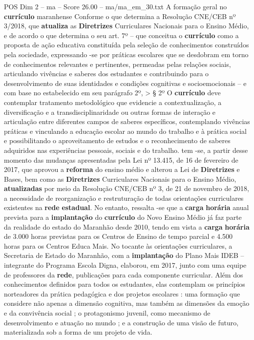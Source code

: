 \begin{textsample}{POS Dim 2 – ma – Score 26.00 – ma/ma\_em\_30.txt}
A formação geral no \textbf{currículo} maranhense Conforme o que determina a Resolução CNE/CEB nº 3/2018, que \textbf{atualiza} as \textbf{Diretrizes} Curriculares Nacionais para o Ensino Médio, e de acordo o que determina o seu art. 7º – que conceitua o \textbf{currículo} como a proposta de ação educativa constituída pela seleção de conhecimentos construídos pela sociedade, expressando -se por práticas escolares que se desdobram em torno de conhecimentos relevantes e pertinentes, permeadas pelas relações sociais, articulando vivências e saberes dos estudantes e contribuindo para o desenvolvimento de suas identidades e condições cognitivas e socioemocionais – e com base no estabelecido em seu parágrafo 2º, > § 2º O \textbf{currículo} deve contemplar tratamento metodológico que evidencie a contextualização, a diversificação e a transdisciplinaridade ou outras formas de interação e articulação entre diferentes campos de saberes específicos, contemplando vivências práticas e vinculando a educação escolar ao mundo do trabalho e à prática social e possibilitando o aproveitamento de estudos e o reconhecimento de saberes adquiridos nas experiências pessoais, sociais e do trabalho. tem -se, a partir desse momento das mudanças apresentadas pela Lei nº 13.415, de 16 de fevereiro de 2017, que aprovou a \textbf{reforma} do ensino médio e alterou a Lei de \textbf{Diretrizes} e Bases, bem como as \textbf{Diretrizes} Curriculares Nacionais para o Ensino Médio, \textbf{atualizadas} por meio da Resolução CNE/CEB nº 3, de 21 de novembro de 2018, a necessidade de reorganização e restruturação de todas orientações curriculares existentes na \textbf{rede} \textbf{estadual}.
No entanto, ressalta -se que a \textbf{carga} \textbf{horária} anual prevista para a \textbf{implantação} do \textbf{currículo} do Novo Ensino Médio já faz parte da realidade do estado do Maranhão desde 2010, tendo em vista a \textbf{carga} \textbf{horária} de 3.000 horas previstas para os Centros de Ensino de tempo parcial e 4.500 horas para os Centros Educa Mais.
No tocante às orientações curriculares, a Secretaria de Estado do Maranhão, com a \textbf{implantação} do Plano Mais IDEB – integrante do Programa Escola Digna, elaborou, em 2017, junto com uma equipe de professores da \textbf{rede}, publicações para cada componente curricular.
Além dos conhecimentos definidos para todos os estudantes, elas contemplam os princípios norteadores da prática pedagógica e dos projetos escolares : uma formação que considere não apenas a dimensão cognitiva, mas também as dimensões da emoção e da convivência social ; o protagonismo juvenil, como mecanismo de desenvolvimento e atuação no mundo ; e a construção de uma visão de futuro, materializada sob a forma de um projeto de vida.

\end{textsample}
